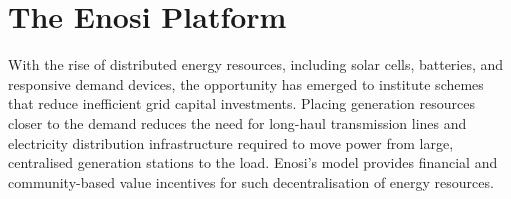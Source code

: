 \documentclass[a4paper,12pt,reqno]{amsart}
\theoremstyle{definition}
\begin{document}
\section{The Enosi Platform}
% 
% 
% 
With the rise of distributed energy resources, including solar cells, batteries, and responsive demand devices, the opportunity has emerged to institute schemes that reduce inefficient grid capital investments. Placing generation resources closer to the demand reduces the need for long-haul transmission lines and electricity distribution infrastructure required to move power from large, centralised generation stations to the load.
Enosi's model provides financial and community-based value incentives for such decentralisation of energy resources.
\end{document}
